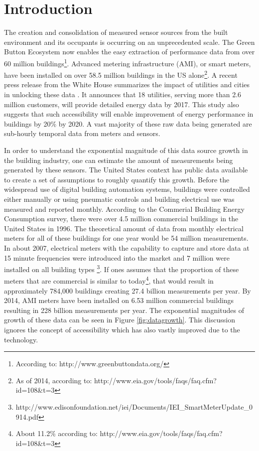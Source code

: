 \section{Introduction}
\label{sec:intro}

The creation and consolidation of measured sensor sources from the built environment and its occupants is occurring on an unprecedented scale. The Green Button Ecosystem now enables the easy extraction of performance data from over 60 million buildings\footnote{According to: http://www.greenbuttondata.org/}. Advanced metering infrastructure (AMI), or smart meters, have been installed on over 58.5 million buildings in the US alone\footnote{As of 2014, according to: http://www.eia.gov/tools/faqs/faq.cfm?id=108&t=3}. A recent press release from the White House summarizes the impact of utilities and cities in unlocking these data \cite{the_white_house_fact_2016}. It announces that 18 utilities, serving more than 2.6 million customers, will provide detailed energy data by 2017. This study also suggests that such accessibility will enable improvement of energy performance in buildings by 20\% by 2020. A vast majority of these raw data being generated are sub-hourly temporal data from meters and sensors.

In order to understand the exponential magnitude of this data source growth in the building industry, one can estimate the amount of measurements being generated by these sensors. The United States context has public data available to create a set of assumptions to roughly quantify this growth. Before the widespread use of digital building automation systems, buildings were controlled either manually or using pneumatic controls and building electrical use was measured and reported monthly. According to the Commerial Building Energy Consumption survey, there were over 4.5 million commercial buildings in the United States in 1996. The theoretical amount of data from monthly electrical meters for all of these buildings for one year would be 54 million measurements. In about 2007, electrical meters with the capability to capture and store data at 15 minute frequencies were introduced into the market and 7 million were installed on all building types \footnote{http://www.edisonfoundation.net/iei/Documents/IEI_SmartMeterUpdate_0914.pdf}. If ones assumes that the proportion of these meters that are commercial is similar to today\footnote{About 11.2\% according to: http://www.eia.gov/tools/faqs/faq.cfm?id=108&t=3}, that would result in approximately 784,000 buildings creating 27.4 billion measurements per year. By 2014, AMI meters have been installed on 6.53 million commercial buildings resulting in 228 billion measurements per year. The exponential magnitudes of growth of these data can be seen in Figure \ref{fig:datagrowth}. This discussion ignores the concept of accessibility which has also vastly improved due to the technology.

